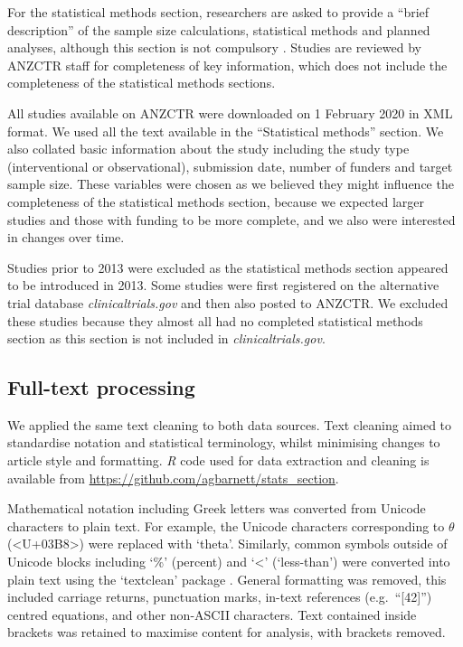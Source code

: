 \documentclass[12pt]{article}
\begin{document}
For the statistical methods section, researchers are asked to provide a
``brief description'' of the sample size calculations, statistical
methods and planned analyses, although this section is not compulsory
\citep{ANZCTR}. Studies are reviewed by ANZCTR staff for completeness of
key information, which does not include the completeness of the
statistical methods sections.

All studies available on ANZCTR were downloaded on 1 February 2020 in
XML format. We used all the text available in the ``Statistical
methods'' section. We also collated basic information about the study
including the study type (interventional or observational), submission
date, number of funders and target sample size. These variables were
chosen as we believed they might influence the completeness of the
statistical methods section, because we expected larger studies and
those with funding to be more complete, and we also were interested in
changes over time.

Studies prior to 2013 were excluded as the statistical methods section
appeared to be introduced in 2013. Some studies were first registered on
the alternative trial database \emph{clinicaltrials.gov} and then also
posted to ANZCTR. We excluded these studies because they almost all had
no completed statistical methods section as this section is not included
in \emph{clinicaltrials.gov}.

\subsection{Full-text processing}
\label{sec:methods-cleaning}

We applied the same text cleaning to both data sources. Text cleaning
aimed to standardise notation and statistical terminology, whilst
minimising changes to article style and formatting. \emph{R} code used
for data extraction and cleaning is available from
\url{https://github.com/agbarnett/stats_section}.

Mathematical notation including Greek letters was converted from Unicode
characters to plain text. For example, the Unicode characters
corresponding to \(\theta\) (\textless U+03B8\textgreater) were replaced
with `theta'. Similarly, common symbols outside of Unicode blocks
including `\%' (percent) and `\textless{}' (`less-than') were converted
into plain text using the `textclean' package \citep{textclean}. General
formatting was removed, this included carriage returns, punctuation
marks, in-text references (e.g.~``{[}42{]}'') centred equations, and
other non-ASCII characters. Text contained inside brackets was retained
to maximise content for analysis, with brackets removed.
\end{document}

